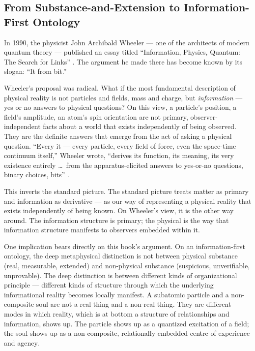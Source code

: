 \subsection{From Substance-and-Extension to Information-First Ontology}
\label{subsec:information-first}

In 1990, the physicist John Archibald Wheeler --- one of the architects of
modern quantum theory --- published an essay titled ``Information, Physics,
Quantum: The Search for Links'' \citep{Wheeler1990}. The argument he made there
has become known by its slogan: ``It from bit.''

Wheeler's proposal was radical. What if the most fundamental description of
physical reality is not particles and fields, mass and charge, but
\emph{information} --- yes or no answers to physical questions? On this view, a
particle's position, a field's amplitude, an atom's spin orientation are not
primary, observer-independent facts about a world that exists independently of
being observed. They are the definite answers that emerge from the act of asking a
physical question. ``Every it --- every particle, every field of force, even
the space-time continuum itself,'' Wheeler wrote, ``derives its function, its
meaning, its very existence entirely \ldots\ from the apparatus-elicited answers
to yes-or-no questions, binary choices, bits'' \citep{Wheeler1990}.

This inverts the standard picture. The standard picture
treats matter as primary and information as derivative --- as our way of
representing a physical reality that exists independently of being known. On
Wheeler's view, it is the other way around. The information structure is
primary; the physical is the way that information structure manifests to
observers embedded within it.

One implication bears directly on this book's argument. On an information-first
ontology, the deep metaphysical distinction
is not between physical substance (real, measurable, extended) and
non-physical substance (suspicious, unverifiable, unprovable). The deep
distinction is between different kinds of organizational principle --- different
kinds of structure through which the underlying informational reality becomes
locally manifest. A subatomic particle and a non-composite soul are not a real
thing and a non-real thing. They are different modes in which reality, which is
at bottom a structure of relationships and information, shows up. The particle
shows up as a quantized excitation of a field; the soul shows up as a
non-composite, relationally embedded centre of experience and agency.

